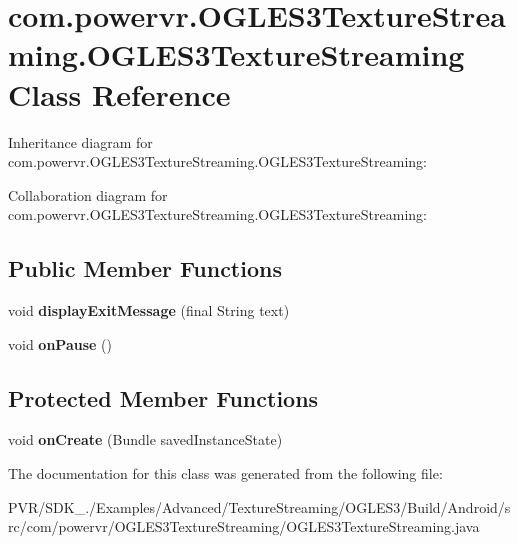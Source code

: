 \hypertarget{classcom_1_1powervr_1_1_o_g_l_e_s3_texture_streaming_1_1_o_g_l_e_s3_texture_streaming}{\section{com.\+powervr.\+O\+G\+L\+E\+S3\+Texture\+Streaming.\+O\+G\+L\+E\+S3\+Texture\+Streaming Class Reference}
\label{classcom_1_1powervr_1_1_o_g_l_e_s3_texture_streaming_1_1_o_g_l_e_s3_texture_streaming}
}


Inheritance diagram for com.\+powervr.\+O\+G\+L\+E\+S3\+Texture\+Streaming.\+O\+G\+L\+E\+S3\+Texture\+Streaming\+:


Collaboration diagram for com.\+powervr.\+O\+G\+L\+E\+S3\+Texture\+Streaming.\+O\+G\+L\+E\+S3\+Texture\+Streaming\+:
\subsection*{Public Member Functions}
\begin{DoxyCompactItemize}
\item 
\hypertarget{classcom_1_1powervr_1_1_o_g_l_e_s3_texture_streaming_1_1_o_g_l_e_s3_texture_streaming_a681b9b3e6a572d7f10270ef1e867c41e}{void {\bfseries display\+Exit\+Message} (final String text)}\label{classcom_1_1powervr_1_1_o_g_l_e_s3_texture_streaming_1_1_o_g_l_e_s3_texture_streaming_a681b9b3e6a572d7f10270ef1e867c41e}

\item 
\hypertarget{classcom_1_1powervr_1_1_o_g_l_e_s3_texture_streaming_1_1_o_g_l_e_s3_texture_streaming_aa0bf9deb9d88dbf923ff043f770c8f27}{void {\bfseries on\+Pause} ()}\label{classcom_1_1powervr_1_1_o_g_l_e_s3_texture_streaming_1_1_o_g_l_e_s3_texture_streaming_aa0bf9deb9d88dbf923ff043f770c8f27}

\end{DoxyCompactItemize}
\subsection*{Protected Member Functions}
\begin{DoxyCompactItemize}
\item 
\hypertarget{classcom_1_1powervr_1_1_o_g_l_e_s3_texture_streaming_1_1_o_g_l_e_s3_texture_streaming_aeb83e5d2808a103ff2431a14feee1b0c}{void {\bfseries on\+Create} (Bundle saved\+Instance\+State)}\label{classcom_1_1powervr_1_1_o_g_l_e_s3_texture_streaming_1_1_o_g_l_e_s3_texture_streaming_aeb83e5d2808a103ff2431a14feee1b0c}

\end{DoxyCompactItemize}


The documentation for this class was generated from the following file\+:\begin{DoxyCompactItemize}
\item 
P\+V\+R/\+S\+D\+K\+\_./\+Examples/\+Advanced/\+Texture\+Streaming/\+O\+G\+L\+E\+S3/\+Build/\+Android/src/com/powervr/\+O\+G\+L\+E\+S3\+Texture\+Streaming/O\+G\+L\+E\+S3\+Texture\+Streaming.\+java\end{DoxyCompactItemize}
